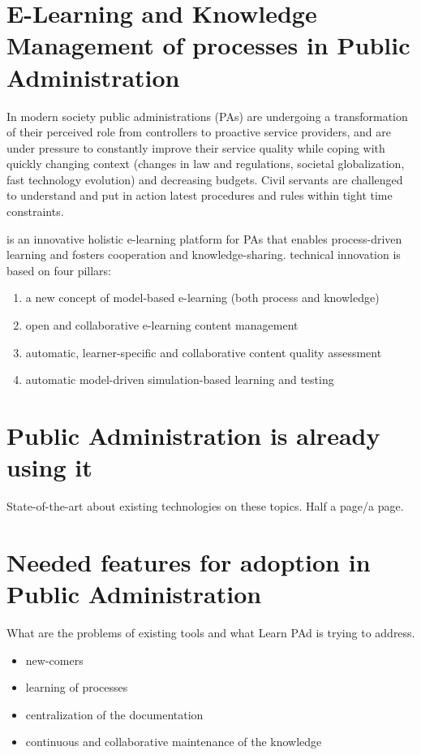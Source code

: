 \documentclass{learnpad}
\begin{document}
\chapter{E-Learning and Knowledge Management of processes in Public Administration}
\label{ch:intro}
In modern society public administrations (PAs) are undergoing a transformation
of their perceived role from controllers to proactive service providers, and are
under pressure to constantly improve their service quality while coping with
quickly changing context (changes in law and regulations, societal
globalization, fast technology evolution) and decreasing budgets.  Civil
servants are challenged to understand and put in action latest procedures and
rules within tight time constraints.

\learnpad is an innovative holistic e-learning platform for PAs that enables
process-driven learning and fosters cooperation and knowledge-sharing.
\learnpad technical innovation is based on four pillars:
\begin{enumerate}
	\item a new concept of model-based e-learning (both process and knowledge)
	\item open and collaborative e-learning content management
	\item automatic, learner-specific and collaborative content quality assessment
	\item automatic model-driven simulation-based learning and testing
\end{enumerate}

\chapter{Public Administration is already using it}
\label{ch:sota}
State-of-the-art about existing technologies on these topics.
Half a page/a page.

\chapter{Needed features for adoption in Public Administration}
\label{ch:problematic}
What are the problems of existing tools and what Learn PAd is trying to address.
\begin{itemize}
	\item new-comers
	\item learning of processes
	\item centralization of the documentation
	\item continuous and collaborative maintenance of the knowledge
\end{itemize}
\end{document}

